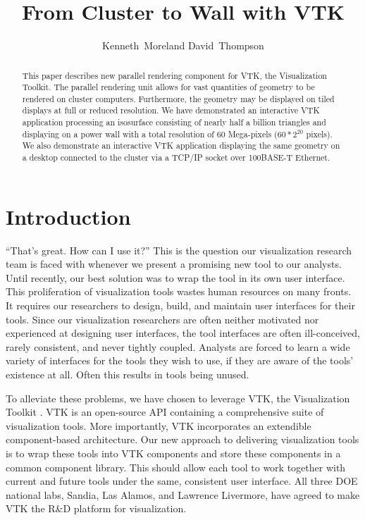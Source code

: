 \documentclass[twocolumn]{article}
\title{From Cluster to Wall with VTK}
\author{Kenneth~Moreland David~Thompson}
\begin{document}
  \maketitle

  \begin{abstract}
    This paper describes new parallel rendering component for VTK, the
    Visualization Toolkit.  The parallel rendering unit allows for vast
    quantities of geometry to be rendered on cluster computers.
    Furthermore, the geometry may be displayed on tiled displays at full or
    reduced resolution.  We have demonstrated an interactive VTK
    application processing an isosurface consisting of nearly half a
    billion triangles and displaying on a power wall with a total
    resolution of 60 Mega-pixels ($60*2^{20}$ pixels).  We also demonstrate
    an interactive VTK application displaying the same geometry on a
    desktop connected to the cluster via a TCP/IP socket over 100BASE-T
    Ethernet.
  \end{abstract}

  \section{Introduction}
  \label{sec:introduction}

  ``That's great.  How can I use it?''  This is the question our
  visualization research team is faced with whenever we present a promising
  new tool to our analysts.  Until recently, our best solution was to wrap
  the tool in its own user interface.  This proliferation of visualization
  tools wastes human resources on many fronts.  It requires our researchers
  to design, build, and maintain user interfaces for their tools.  Since
  our visualization researchers are often neither motivated nor experienced
  at designing user interfaces, the tool interfaces are often
  ill-conceived, rarely consistent, and never tightly coupled.  Analysts
  are forced to learn a wide variety of interfaces for the tools they wish
  to use, if they are aware of the tools' existence at all.  Often this
  results in tools being unused.

  To alleviate these problems, we have chosen to leverage VTK, the
  Visualization Toolkit \cite{Schroeder98}.  VTK is an open-source API
  containing a comprehensive suite of visualization tools.  More
  importantly, VTK incorporates an extendible component-based architecture.
  Our new approach to delivering visualization tools is to wrap these tools
  into VTK components and store these components in a common component
  library.  This should allow each tool to work together with current and
  future tools under the same, consistent user interface.  All three DOE
  national labs, Sandia, Las Alamos, and Lawrence Livermore, have agreed to
  make VTK the R\&D platform for visualization.
\end{document}
